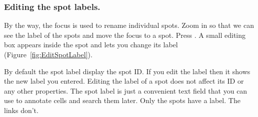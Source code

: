 \subsubsection{Editing the spot labels.}

By the way, the focus is used to rename individual spots.
Zoom in so that we can see the label of the spots and move the focus to a spot. 
Press \keys{\return}.
A small editing box appears inside the spot and lets you change its label (Figure~\ref{fig:EditSpotLabel}).

By default the spot label display the spot ID. 
If you edit the label then it shows the new label you entered.
Editing the label of a spot does not affect its ID or any other properties. 
The spot label is just a convenient text field that you can use to annotate cells and search them later.
Only the spots have a label. 
The links don't.

